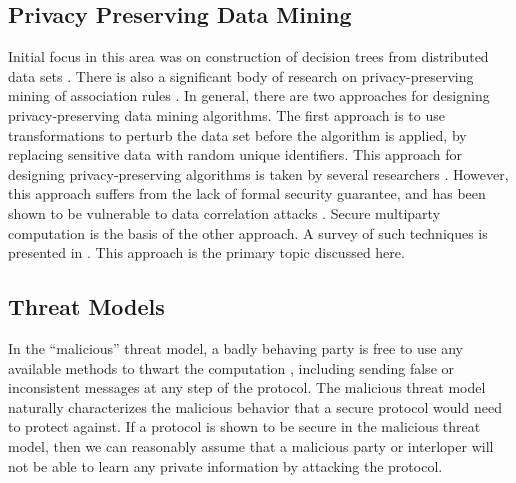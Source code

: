 \subsection{Privacy Preserving Data Mining }

Initial focus in this area was on construction of decision trees from
distributed data sets \cite{Agrawal-Srikant,Lindell-Pinkas}. There
is also a significant body of research on privacy-preserving mining
of association rules \cite{Gehrke:2002,RizviHarista,VaidyaClifton:2002}.
In general, there are two approaches for designing privacy-preserving
data mining algorithms. The first approach is to use transformations
to perturb the data set before the algorithm is applied, by replacing
sensitive data with random unique identifiers. This approach for designing
privacy-preserving algorithms is taken by several researchers \cite{Klusch,MeruguGhosh,Oliveira}.
However, this approach suffers from the lack of formal security guarantee,
and has been shown to be vulnerable to data correlation attacks \cite{Malin04}.
Secure multiparty computation is the basis of the other approach.
A survey of such techniques is presented in \cite{PinkasCryptoPPDM02}.
This approach is the primary topic discussed here.


\subsection{Threat Models\label{sub:Threat-Models}}

In the {}``malicious'' threat model, a badly behaving party is free
to use any available methods to thwart the computation , including
sending false or inconsistent messages at any step of the protocol.
The malicious threat model naturally characterizes the malicious behavior
that a secure protocol would need to protect against. If a protocol
is shown to be secure in the malicious threat model, then we can reasonably
assume that a malicious party or interloper will not be able to learn
any private information by attacking the protocol.

